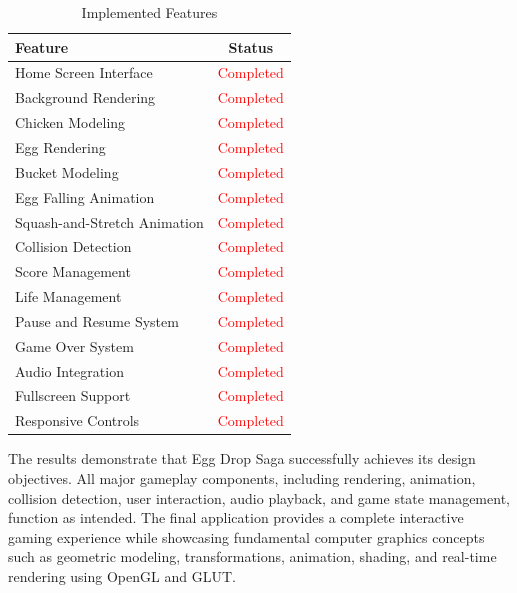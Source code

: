 \documentclass[12pt,a4paper]{report}
\begin{document}
\begin{table}[H]
\centering

\label{tab:features}
\begin{tabular}{|l|c|}
\hline
\textbf{Feature} & \textbf{Status} \\
\hline
Home Screen Interface & \textcolor{red}{Completed} \\
\hline
Background Rendering & \textcolor{red}{Completed} \\
\hline
Chicken Modeling & \textcolor{red}{Completed} \\
\hline
Egg Rendering & \textcolor{red}{Completed} \\
\hline
Bucket Modeling & \textcolor{red}{Completed} \\
\hline
Egg Falling Animation & \textcolor{red}{Completed} \\
\hline
Squash-and-Stretch Animation & \textcolor{red}{Completed} \\
\hline
Collision Detection & \textcolor{red}{Completed} \\
\hline
Score Management & \textcolor{red}{Completed} \\
\hline
Life Management & \textcolor{red}{Completed} \\
\hline
Pause and Resume System & \textcolor{red}{Completed} \\
\hline
Game Over System & \textcolor{red}{Completed} \\
\hline
Audio Integration & \textcolor{red}{Completed} \\
\hline
Fullscreen Support & \textcolor{red}{Completed} \\
\hline
Responsive Controls & \textcolor{red}{Completed} \\
\hline
\end{tabular}
\caption{Implemented Features}
\end{table}



The results demonstrate that Egg Drop Saga successfully achieves its design objectives. All major gameplay components, including rendering, animation, collision detection, user interaction, audio playback, and game state management, function as intended. The final application provides a complete interactive gaming experience while showcasing fundamental computer graphics concepts such as geometric modeling, transformations, animation, shading, and real-time rendering using OpenGL and GLUT.
\end{document}
